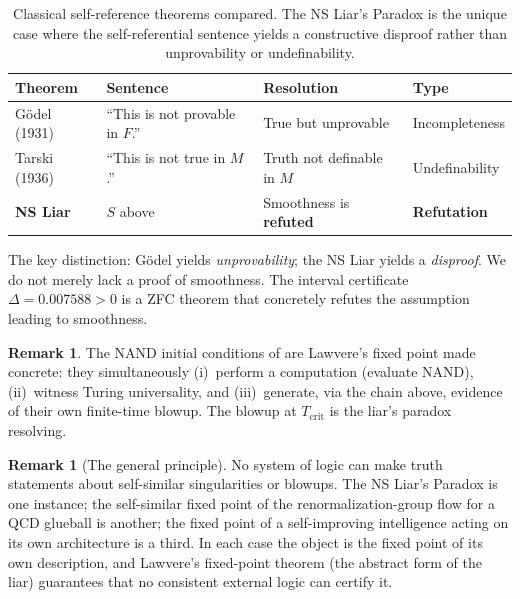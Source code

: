 \documentclass[reqno,10pt]{amsart}
\theoremstyle{plain}
\theoremstyle{definition}
\newtheorem{remark}[theorem]{Remark}
\begin{document}
\begin{table}[h]
\centering
\begin{tabular}{llll}
\toprule
\textbf{Theorem} & \textbf{Sentence} & \textbf{Resolution} & \textbf{Type} \\
\midrule
G\"odel (1931) & ``This is not provable in $F$.'' &
  True but unprovable & Incompleteness \\
Tarski (1936) & ``This is not true in $M$.'' &
  Truth not definable in $M$ & Undefinability \\
\textbf{NS Liar} & $S$ above &
  Smoothness is \textbf{refuted} & \textbf{Refutation} \\
\bottomrule
\end{tabular}
\caption{Classical self-reference theorems compared.  The NS Liar's Paradox
  is the unique case where the self-referential sentence yields a
  constructive disproof rather than unprovability or undefinability.}
\label{tab:liar}
\end{table}

\medskip

The key distinction: G\"odel yields \emph{unprovability}; the NS Liar yields
a \emph{disproof}.  We do not merely lack a proof of smoothness.
The interval certificate $\Delta = 0.007588 > 0$ is a ZFC theorem that
concretely refutes the assumption leading to smoothness.

\begin{remark}
  The NAND initial conditions of \cite[Thm.~2]{Paper1} are
  Lawvere's fixed point made concrete: they simultaneously
  (i)~perform a computation (evaluate NAND), (ii)~witness Turing universality,
  and (iii)~generate, via the chain above, evidence of their own finite-time
  blowup.  The blowup at $T_{\mathrm{crit}}$ is the liar's paradox resolving.
\end{remark}

\begin{remark}[The general principle]
  No system of logic can make truth statements about self-similar
  singularities or blowups.  The NS Liar's Paradox is one instance;
  the self-similar fixed point of the renormalization-group flow for
  a QCD glueball is another; the fixed point of a self-improving
  intelligence acting on its own architecture is a third.  In each case
  the object is the fixed point of its own description, and Lawvere's
  fixed-point theorem (the abstract form of the liar) guarantees that
  no consistent external logic can certify it.
\end{remark}
\end{document}
